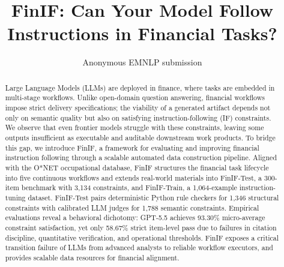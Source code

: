 \documentclass[11pt]{article}
\title{FinIF: Can Your Model Follow Instructions in Financial Tasks?}
\author{Anonymous EMNLP submission}
\begin{document}
\maketitle
\begin{abstract}
Large Language Models (LLMs) are deployed in finance, where tasks are embedded in multi-stage workflows.
Unlike open-domain question answering, financial workflows impose strict delivery specifications; the viability of a generated artifact depends not only on semantic quality but also on satisfying instruction-following (IF) constraints.
We observe that even frontier models struggle with these constraints, leaving some outputs insufficient as executable and auditable downstream work products.
To bridge this gap, we introduce FinIF, a framework for evaluating and improving financial instruction following through a scalable automated data construction pipeline.
Aligned with the O*NET occupational database, FinIF structures the financial task lifecycle into five continuous workflows and extends real-world materials into FinIF-Test, a 300-item benchmark with 3,134 constraints, and FinIF-Train, a 1,064-example instruction-tuning dataset.
FinIF-Test pairs deterministic Python rule checkers for 1,346 structural constraints with calibrated LLM judges for 1,788 semantic constraints.
Empirical evaluations reveal a behavioral dichotomy: GPT-5.5 achieves 93.30\% micro-average constraint satisfaction, yet only 58.67\% strict item-level pass due to failures in citation discipline, quantitative verification, and operational thresholds.
FinIF exposes a critical transition failure of LLMs from advanced analysts to reliable workflow executors, and provides scalable data resources for financial alignment.
\end{abstract}








% 

\end{document}
